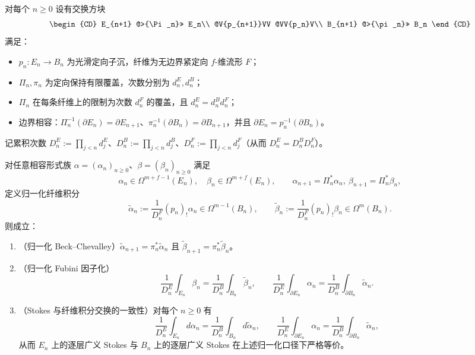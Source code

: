 

\begin{theorem}\label{thm:app-normalized-bc-stokes-fibered-inverse-tower}
对每个 \(n\ge 0\) 设有交换方块
\[
\begin{CD}
E_{n+1} @>{\Pi_n}>> E_n\\
@V{p_{n+1}}VV @VV{p_n}V\\
B_{n+1} @>{\pi_n}>> B_n
\end{CD}
\]
满足：
\begin{itemize}
  \item \(p_n:E_n\to B_n\) 为光滑定向子沉，纤维为无边界紧定向 \(f\)-维流形 \(F\)；
  \item \(\Pi_n,\pi_n\) 为定向保持有限覆盖，次数分别为 \(d_n^{E},d_n^{B}\)；
  \item \(\Pi_n\) 在每条纤维上的限制为次数 \(d_n^{F}\) 的覆盖，且 \(d_n^{E}=d_n^{B}d_n^{F}\)；
  \item 边界相容：\(\Pi_n^{-1}(\partial E_n)=\partial E_{n+1}\)、\(\pi_n^{-1}(\partial B_n)=\partial B_{n+1}\)，并且 \(\partial E_n=p_n^{-1}(\partial B_n)\)。
\end{itemize}
记累积次数 \(D_n^{E}:=\prod_{j<n}d_j^{E}\)、\(D_n^{B}:=\prod_{j<n}d_j^{B}\)、\(D_n^{F}:=\prod_{j<n}d_j^{F}\)（从而 \(D_n^{E}=D_n^{B}D_n^{F}\)）。
\par
对任意相容形式族 \(\alpha=(\alpha_n)_{n\ge 0}\)、\(\beta=(\beta_n)_{n\ge 0}\) 满足
\[
\alpha_n\in\Omega^{m+f-1}(E_n),\quad \beta_n\in\Omega^{m+f}(E_n),\qquad
\alpha_{n+1}=\Pi_n^\ast\alpha_n,\ \beta_{n+1}=\Pi_n^\ast\beta_n,
\]
定义归一化纤维积分
\[
\widetilde{\alpha}_n:=\frac{1}{D_n^{F}}(p_n)_!\alpha_n\in\Omega^{m-1}(B_n),
\qquad
\widetilde{\beta}_n:=\frac{1}{D_n^{F}}(p_n)_!\beta_n\in\Omega^{m}(B_n).
\]
则成立：
\begin{enumerate}
  \item （归一化 Beck--Chevalley）\(\widetilde{\alpha}_{n+1}=\pi_n^\ast\widetilde{\alpha}_n\) 且 \(\widetilde{\beta}_{n+1}=\pi_n^\ast\widetilde{\beta}_n\)。
  \item （归一化 Fubini 因子化）
  \[
  \frac{1}{D_n^{E}}\int_{E_n}\beta_n=\frac{1}{D_n^{B}}\int_{B_n}\widetilde{\beta}_n,
  \qquad
  \frac{1}{D_n^{E}}\int_{\partial E_n}\alpha_n=\frac{1}{D_n^{B}}\int_{\partial B_n}\widetilde{\alpha}_n.
  \]
  \item （Stokes 与纤维积分交换的一致性）对每个 \(n\ge 0\) 有
  \[
  \frac{1}{D_n^{E}}\int_{E_n}d\alpha_n=\frac{1}{D_n^{B}}\int_{B_n}d\widetilde{\alpha}_n,
  \qquad
  \frac{1}{D_n^{E}}\int_{\partial E_n}\alpha_n=\frac{1}{D_n^{B}}\int_{\partial B_n}\widetilde{\alpha}_n,
  \]
  从而 \(E_n\) 上的逐层广义 Stokes 与 \(B_n\) 上的逐层广义 Stokes 在上述归一化口径下严格等价。
\end{enumerate}
\end{theorem}

